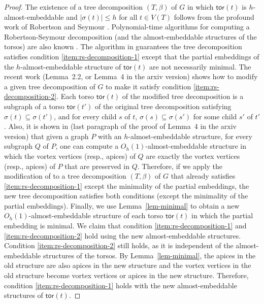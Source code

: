 \documentclass[a4paper,11pt]{article}
\numberwithin{lemma}{section}
\newcommand{\tor}{\mathsf{tor}}
\begin{document}
\begin{proof}
The existence of a tree decomposition $(T,\beta)$ of $G$ in which $\tor(t)$ is $h$-almost-embeddable and $|\sigma(t)| \leq h$ for all $t \in V(T)$ follows from the profound work of Robertson and Seymour \cite{RobertsonS03a}.
Polynomial-time algorithms for computing a Robertson-Seymour decomposition (and the almost-embeddable structures of the torsos) are also known \cite{DemaineHK05,GroheKR13,KawarabayashiW11}.
The algorithm in \cite{DemaineHK05} guarantees the tree decomposition satisfies condition \ref{item:rs-decomposition-1} except that the partial embeddings of the $h$-almost-embeddable structure of $\tor(t)$ are not necessarily minimal.
The recent work \cite{BandyapadhyayLLSJ22} (Lemma~2.2, or Lemma~4 in the arxiv version) shows how to modify a given tree decomposition of $G$ to make it satisfy condition \ref{item:rs-decomposition-2}.
Each torso $\tor(t)$ of the modified tree decomposition is a subgraph of a torso $\tor(t')$ of the original tree decomposition satisfying $\sigma(t) \subseteq \sigma(t')$, and for every child $s$ of $t$, $\sigma(s) \subseteq \sigma(s')$ for some child $s'$ of $t'$.
Also, it is shown in \cite{BandyapadhyayLLSJ22} (last paragraph of the proof of Lemma~4 in the arxiv version) that given a graph $P$ with an $h$-almost-embeddable structure, for every subgraph $Q$ of $P$, one can compute a $O_h(1)$-almost-embeddable structure in which the vortex vertices (resp., apices) of $Q$ are exactly the vortex vertices (resp., apices) of $P$ that are preserved in $Q$.
Therefore, if we apply the modification of \cite{BandyapadhyayLLSJ22} to a tree decomposition $(T,\beta)$ of $G$ that already satisfies \ref{item:rs-decomposition-1} except the minimality of the partial embeddings, the new tree decomposition satisfies both conditions (except the minimality of the partial embeddings).
Finally, we use Lemma~\ref{lem-minimal} to obtain a new $O_h(1)$-almost-embeddable structure of each torso $\tor(t)$ in which the partial embedding is minimal.
We claim that condition \ref{item:rs-decomposition-1} and \ref{item:rs-decomposition-2} hold using the new almost-embeddable structures.
Condition \ref{item:rs-decomposition-2} still holds, as it is independent of the almost-embeddable structures of the torsos.
By Lemma~\ref{lem-minimal}, the apices in the old structure are also apices in the new structure and the vortex vertices in the old structure become vortex vertices or apices in the new structure.
Therefore, condition \ref{item:rs-decomposition-1} holds with the new almost-embeddable structures of $\tor(t)$.
\end{proof}
\end{document}
